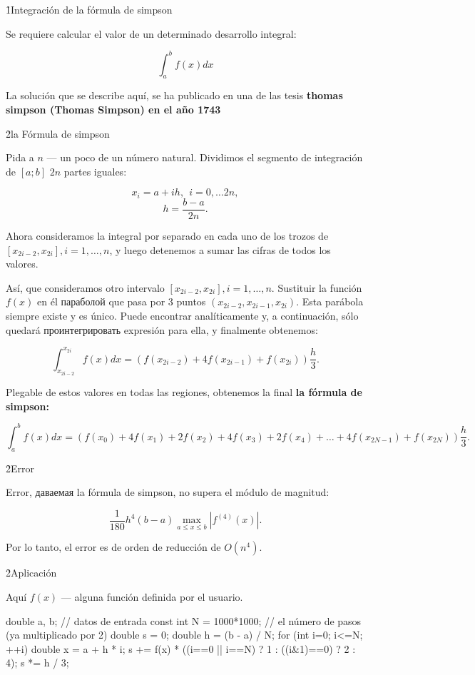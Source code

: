 \h1{Integración de la fórmula de simpson}

Se requiere calcular el valor de un determinado desarrollo integral:

$$ \int_a^b f(x) dx $$

La solución que se describe aquí, se ha publicado en una de las tesis \bf{thomas simpson} (Thomas Simpson) en el año 1743


\h2{la Fórmula de simpson}

Pida a $n$ --- un poco de un número natural. Dividimos el segmento de integración de $[a;b]$ $2n$ partes iguales:

$$ x_i = a + i h,~~i = 0, \ldots 2n, $$
$$ h = \frac{ b-a }{ 2n }. $$

Ahora consideramos la integral por separado en cada uno de los trozos de $[x_{2i-2}, x_{2i}], i = 1, \ldots, n$, y luego detenemos a sumar las cifras de todos los valores.

Así, que consideramos otro intervalo $[x_{2i-2}, x_{2i}], i = 1, \ldots, n$. Sustituir la función $f(x)$ en él параболой que pasa por 3 puntos $(x_{2i-2},x_{2i-1},x_{2i})$. Esta parábola siempre existe y es único. Puede encontrar analíticamente y, a continuación, sólo quedará проинтегрировать expresión para ella, y finalmente obtenemos:

$$ \int_{x_{2i-2}}^{x_{2i}} f(x) dx = \left( f(x_{2i-2}) + 4 f(x_{2i-1}) + f(x_{2i}) \right) \frac{ h }{ 3 }. $$

Plegable de estos valores en todas las regiones, obtenemos la final \bf{la fórmula de simpson}:

$$ \int_a^b f(x) dx = \left( f(x_0) + 4 f(x_1) + 2 f(x_2) + 4 f(x_3) + 2 f(x_4) + \ldots + 4 f(x_{2N-1}) + f(x_{2N}) \right) \frac{ h }{ 3 }. $$


\h2{Error}

Error, даваемая la fórmula de simpson, no supera el módulo de magnitud:

$$ \frac{ 1 }{ 180 } h^4 (b - a) \max_{a \le x \le b} \left| f^{(4)}(x) \right|. $$

Por lo tanto, el error es de orden de reducción de $O (n^4)$.


\h2{Aplicación}

Aquí $f(x)$ --- alguna función definida por el usuario.

\code
double a, b; // datos de entrada
const int N = 1000*1000; // el número de pasos (ya multiplicado por 2)
double s = 0;
double h = (b - a) / N;
for (int i=0; i<=N; ++i) {
double x = a + h * i;
s += f(x) * ((i==0 || i==N) ? 1 : ((i&1)==0) ? 2 : 4);
}
s *= h / 3;
\endcode